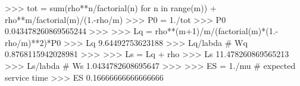 
>>> tot = sum(rho**n/factorial(n) for n in range(m)) +
rho**m/factorial(m)/(1.-rho/m)
>>> P0 = 1./tot
>>> P0
0.043478260869565244
>>>
>>> Lq = rho**(m+1)/m/(factorial(m)*(1.-rho/m)**2)*P0
>>> Lq
9.64492753623188
>>> Lq/labda # Wq
0.8768115942028981
>>>
>>> Ls = Lq + rho
>>> Ls
11.478260869565213
>>> Ls/labda # Ws
1.0434782608695647
>>>
>>> ES = 1./mu # expected service time
>>> ES
0.16666666666666666

